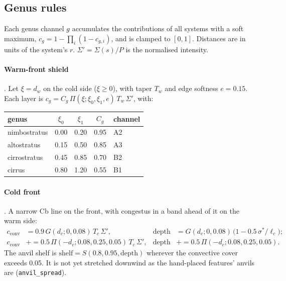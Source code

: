 \documentclass[11pt,a4paper]{article}
\begin{document}
\subsection{Genus rules}
\label{sec:eq-rules}
Each genus channel $g$ accumulates the contributions of all systems with a soft maximum,
$c_g=1-\prod_i(1-c_{g,i})$, and is clamped to $[0,1]$. Distances are in units of the system's
$r$. $\Sigma'=\Sigma(s)/P$ is the normalised intensity.

\paragraph{Warm-front shield} \cite{carlson1980}. Let $\xi=d_w$ on the cold side
($\xi\ge0$), with taper $T_w$ and edge softness $e=0.15$. Each layer is
$c_g=C_g\,\Pi(\xi;\xi_0,\xi_1,e)\,T_w\,\Sigma'$, with:

\begin{center}
\begin{tabular}{lcccl}
\toprule
genus & $\xi_0$ & $\xi_1$ & $C_g$ & channel\\
\midrule
nimbostratus & 0.00 & 0.20 & 0.95 & A2\\
altostratus  & 0.15 & 0.50 & 0.85 & A3\\
cirrostratus & 0.45 & 0.85 & 0.70 & B2\\
cirrus       & 0.80 & 1.20 & 0.55 & B1\\
\bottomrule
\end{tabular}
\end{center}

\paragraph{Cold front} \cite{browning1994}. A narrow Cb line on the front, with congestus in a
band ahead of it on the warm side:
\begin{align}
  c_{\mathrm{conv}}&=0.9\,G(d_c;0,0.08)\,T_c\,\Sigma',&
  \mathrm{depth}&=G(d_c;0,0.08)\,\big(1-0.5\,\sigma^*/\ell_c\big);\\
  c_{\mathrm{conv}}&\mathrel{+}=0.5\,\Pi(-d_c;0.08,0.25,0.05)\,T_c\,\Sigma',&
  \mathrm{depth}&\mathrel{+}=0.5\,\Pi(-d_c;0.08,0.25,0.05).
\end{align}
The anvil shelf is
$\mathrm{shelf}=S(0.8,0.95,\mathrm{depth})$ wherever the convective cover exceeds 0.05. It is
not yet stretched downwind as the hand-placed features' anvils are (\texttt{anvil\_spread}).
\end{document}
